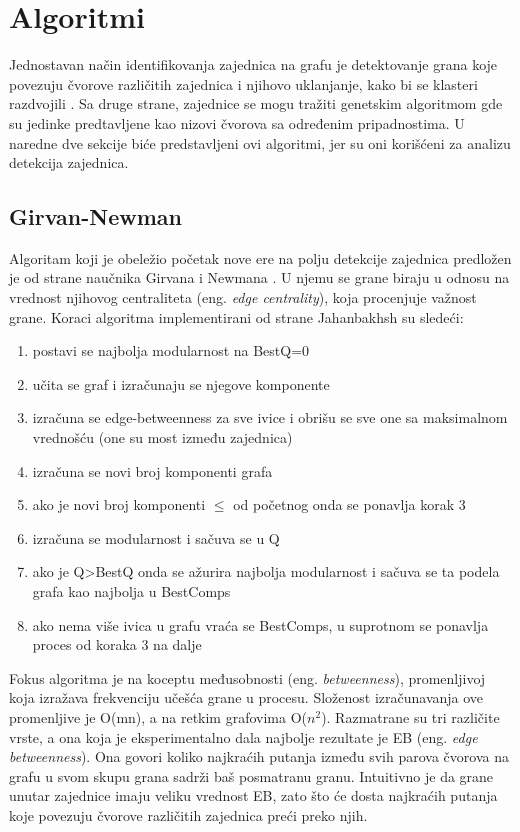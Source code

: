 \documentclass[a4paper]{article}
\begin{document}
\section{Algoritmi}
\label{sec:algoritmi}
Jednostavan način identifikovanja zajednica na grafu je detektovanje grana koje povezuju čvorove različitih zajednica i njihovo uklanjanje, kako bi se klasteri razdvojili \cite{newman2004finding}. Sa druge strane, zajednice se mogu tražiti genetskim algoritmom gde su jedinke predtavljene kao nizovi čvorova sa određenim pripadnostima. U naredne dve sekcije biće predstavljeni ovi algoritmi, jer su oni korišćeni za analizu detekcija zajednica.

\subsection{Girvan-Newman}
Algoritam koji je obeležio početak nove ere na polju detekcije zajednica predložen je od strane naučnika Girvana i Newmana \cite{newman2004finding}. U njemu se grane biraju u odnosu na vrednost njihovog centraliteta (eng. \textit{edge centrality}), koja procenjuje važnost grane. Koraci algoritma implementirani od strane Jahanbakhsh \cite{gn_algo} su sledeći:
\begin{enumerate}
\item postavi se najbolja modularnost na BestQ=0
\item učita se graf i izračunaju se njegove komponente
\item izračuna se edge-betweenness za sve ivice i obrišu se sve one sa maksimalnom vrednošću (one su most između zajednica)
\item izračuna se novi broj komponenti grafa
\item ako je novi broj komponenti $\leq$ od početnog onda se ponavlja korak 3
\item izračuna se modularnost i sačuva se u Q
\item ako je Q>BestQ onda se ažurira najbolja modularnost i sačuva se ta podela grafa kao najbolja u BestComps 
\item ako nema više ivica u grafu vraća se BestComps, u suprotnom se ponavlja proces od koraka 3 na dalje
\end{enumerate}

Fokus algoritma je na koceptu međusobnosti (eng. \textit{betweenness}), promenljivoj koja izražava frekvenciju učešća grane u procesu. Složenost izračunavanja ove promenljive je O(mn), a na retkim grafovima O($n^2$). Razmatrane su tri različite vrste, a ona koja je eksperimentalno dala najbolje rezultate je EB (eng. \textit{edge betweenness}). Ona govori koliko najkraćih putanja između svih parova čvorova na grafu u svom skupu grana sadrži baš posmatranu granu. Intuitivno je da grane unutar zajednice imaju veliku vrednost EB, zato što će dosta najkraćih putanja koje povezuju čvorove različitih zajednica preći preko njih. 
\end{document}
